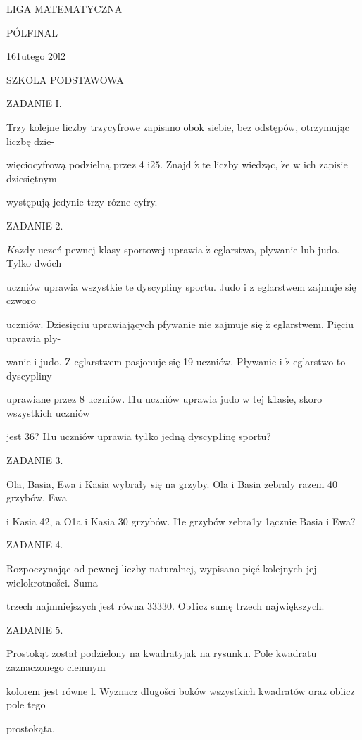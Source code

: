 \documentclass[a4paper,12pt]{article}
\begin{document}
LIGA MATEMATYCZNA

PÓLFINAL

161utego 20l2

SZKOLA PODSTAWOWA

ZADANIE I.

Trzy kolejne liczby trzycyfrowe zapisano obok siebie, bez odstępów, otrzymując liczbę dzie-

więciocyfrową podzielną przez 4 $\mathrm{i}25.$ Znajd $\acute{\mathrm{z}}$ te liczby wiedząc, $\dot{\mathrm{z}}\mathrm{e}$ w ich zapisie dziesiętnym

występują jedynie trzy rózne cyfry.

ZADANIE 2.

$K\mathrm{a}\dot{\mathrm{z}}\mathrm{d}\mathrm{y}$ uczeń pewnej klasy sportowej uprawia $\dot{\mathrm{z}}$ eglarstwo, plywanie lub judo. Tylko dwóch

uczniów uprawia wszystkie te dyscypliny sportu. Judo i $\dot{\mathrm{z}}$ eglarstwem zajmuje się czworo

uczniów. Dziesięciu uprawiających pfywanie nie zajmuje się $\dot{\mathrm{z}}$ eglarstwem. Pięciu uprawia ply-

wanie i judo. $\dot{\mathrm{Z}}$ eglarstwem pasjonuje się 19 uczniów. Pływanie i $\dot{\mathrm{z}}$ eglarstwo to dyscypliny

uprawiane przez 8 uczniów. I1u uczniów uprawia judo w tej k1asie, skoro wszystkich uczniów

jest 36? I1u uczniów uprawia ty1ko jedną dyscyp1inę sportu?

ZADANIE 3.

Ola, Basia, Ewa i Kasia wybrały się na grzyby. Ola i Basia zebraly razem 40 grzybów, Ewa

i Kasia 42, a O1a i Kasia 30 grzybów. I1e grzybów zebra1y 1ącznie Basia i Ewa?

ZADANIE 4.

Rozpoczynając od pewnej liczby naturalnej, wypisano pięć kolejnych jej wielokrotnošci. Suma

trzech najmniejszych jest równa 33330. Ob1icz sumę trzech największych.

ZADANIE 5.

Prostokąt został podzielony na kwadratyjak na rysunku. Pole kwadratu zaznaczonego ciemnym

kolorem jest równe l. Wyznacz dlugošci boków wszystkich kwadratów oraz oblicz pole tego

prostokąta.
\end{document}
